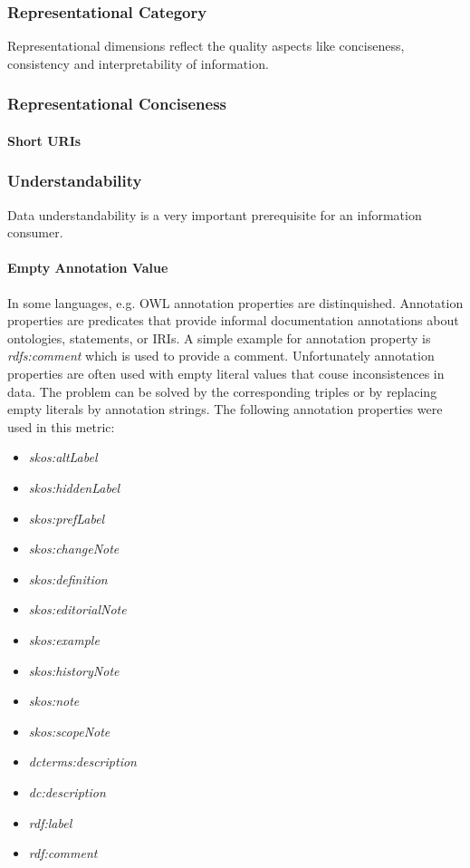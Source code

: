 
\subsubsection{Representational Category}
\label{sec:Representational} 

Representational dimensions reflect the quality aspects like conciseness, consistency and interpretability of information.

\subsubsection{Representational Conciseness}



\paragraph{Short URIs}

\subsubsection{Understandability}

Data understandability is a very important prerequisite for an information consumer.

\paragraph{Empty Annotation Value}

In some languages, e.g. OWL annotation properties are distinquished.
Annotation properties are predicates that provide informal documentation annotations about ontologies, statements, or IRIs. 
A simple example for annotation property is \textit{rdfs:comment} which  is used to provide a comment. 
Unfortunately annotation properties are often used with empty literal values that couse inconsistences in data.
The problem can be solved by the corresponding triples or by replacing empty literals by annotation strings.
The following annotation properties were used in this metric:
\begin{itemize}
\item \textit{skos:altLabel}
\item \textit{skos:hiddenLabel}
\item \textit{skos:prefLabel}
\item \textit{skos:changeNote}
\item \textit{skos:definition}
\item \textit{skos:editorialNote}
\item \textit{skos:example}
\item \textit{skos:historyNote}
\item \textit{skos:note}
\item \textit{skos:scopeNote}
\item \textit{dcterms:description}
\item \textit{dc:description}
\item \textit{rdf:label}
\item \textit{rdf:comment}
\end{itemize}

